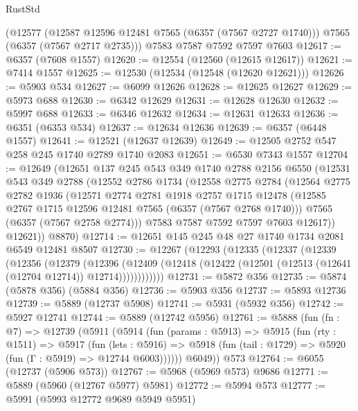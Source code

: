 \begin{lexlean}{RustStd}
\begin{coremodule}
    (@12577
      (@12587 @12596 @12481 @7565 (@6357 (@7567 @2727 @1740)))
      @7565
      (@6357 (@7567 @2717 @2735)))
    @7583
    @7587
    @7592
    @7597
    @7603
@12617 := @6357 (@7608 @1557)
@12620 := @12554 (@12560 (@12615 @12617))
@12621 := @7414 @1557
@12625 := @12530 (@12534 (@12548 (@12620 @12621)))
@12626 := @5903 @534
@12627 := @6099 @12626
@12628 := @12625 @12627
@12629 := @5973 @688
@12630 := @6342 @12629
@12631 := @12628 @12630
@12632 := @5997 @688
@12633 := @6346 @12632
@12634 := @12631 @12633
@12636 := @6351 (@6353 @534)
@12637 := @12634 @12636
@12639 := @6357 (@6448 @1557)
@12641 := @12521 (@12637 @12639)
@12649 := @12505 @2752 @547 @258 @245 @1740 @2789 @1740 @2083
@12651 := @6530 @7343 @1557
@12704 := @12649
    (@12651
      @137
      @245
      @543
      @349
      @1740
      @2788
      @2156
      @6550
      (@12531
        @543
        @349
        @2788
        (@12552
          @2786
          @1734
          (@12558
            @2775
            @2784
            (@12564
              @2775
              @2782
              @1936
              (@12571
                @2774
                @2781
                @1918
                @2757
                @1715
                @12478
                (@12585 @2767 @1715 @12596 @12481 @7565 (@6357 (@7567 @2768 @1740)))
                @7565
                (@6357 (@7567 @2758 @2774)))
              @7583
              @7587
              @7592
              @7597
              @7603
              @12617))
          @12621))
      @8870)
@12714 := @12651 @145 @245 @48 @27 @1740 @1734 @2081 @6549 @12481 @8507
@12730 := @12267
    (@12293
      (@12335
        (@12337
          (@12339
            (@12356
              (@12379
                (@12396
                  (@12409
                    (@12418 (@12422 (@12501 (@12513 (@12641 (@12704 @12714)) @12714))))))))))))
@12731 := @5872 @356
@12735 := @5874 (@5878 @356) (@5884 @356)
@12736 := @5903 @356
@12737 := @5893 @12736
@12739 := @5889 (@12737 @5908)
@12741 := @5931 (@5932 @356)
@12742 := @5927 @12741
@12744 := @5889 (@12742 @5956)
@12761 := @5888
    (fun (fn : @7) =>
    @12739
      (@5911
        (@5914
          (fun (params : @5913) =>
          @5915
            (fun (rty : @1511) =>
            @5917
              (fun (lets : @5916) =>
              @5918 (fun (tail : @1729) => @5920 (fun (Γ : @5919) => @12744 @6003))))))
        @6049))
    @573
@12764 := @6055 (@12737 (@5906 @573))
@12767 := @5968 (@5969 @573) @9686
@12771 := @5889 (@5960 (@12767 @5977) @5981)
@12772 := @5994 @573
@12777 := @5991 (@5993 @12772 @9689 @5949 @5951)

\end{coremodule}
\end{lexlean}
